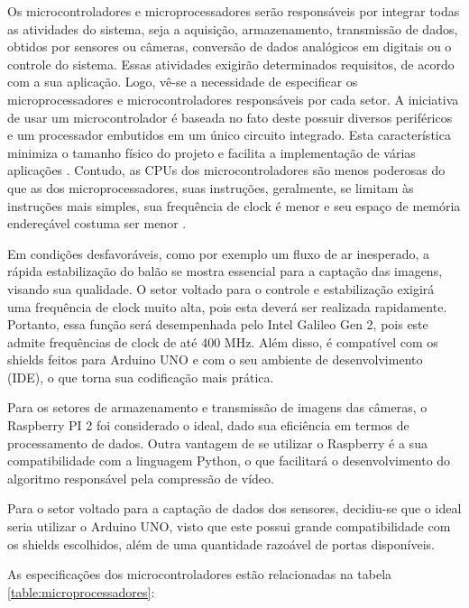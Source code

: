 Os microcontroladores e microprocessadores serão responsáveis por integrar todas as atividades do sistema, seja a aquisição, armazenamento, transmissão de dados, obtidos por sensores ou câmeras, conversão de dados analógicos em digitais ou o controle do sistema. Essas atividades exigirão determinados requisitos, de acordo com a sua aplicação. Logo, vê-se a necessidade de especificar os microprocessadores e microcontroladores responsáveis por cada setor. A iniciativa de usar um microcontrolador é baseada no fato deste possuir diversos periféricos e um processador embutidos em um único circuito integrado. Esta característica minimiza o tamanho físico do projeto e facilita a implementação de várias aplicações \cite{prado2009implementaccao}.  Contudo, as CPUs dos microcontroladores são menos poderosas do que as dos microprocessadores, suas instruções, geralmente, se limitam às instruções mais simples, sua frequência de clock é menor e seu espaço de memória endereçável costuma ser menor \cite{rucinski}.

Em condições desfavoráveis, como por exemplo um fluxo de ar inesperado, a rápida estabilização do balão se mostra essencial para a captação das imagens, visando sua qualidade. O setor voltado para o controle e estabilização exigirá uma frequência de clock muito alta, pois esta deverá ser realizada rapidamente. Portanto, essa função será desempenhada pelo Intel Galileo Gen 2, pois este admite frequências de clock de até 400 MHz. Além disso, é compatível com os shields feitos para Arduino UNO e com o seu ambiente de desenvolvimento (IDE), o que torna sua codificação mais prática.

Para os setores de armazenamento e transmissão de imagens das câmeras, o Raspberry PI 2 foi considerado o ideal, dado sua eficiência em termos de processamento de dados. Outra vantagem de se utilizar o Raspberry é a sua compatibilidade com a linguagem Python, o que facilitará o desenvolvimento do algoritmo responsável pela compressão de vídeo.

Para o setor voltado para a captação de dados dos sensores, decidiu-se que o ideal seria utilizar o Arduino UNO, visto que este possui grande compatibilidade com os shields escolhidos, além de uma quantidade razoável de portas disponíveis.

As especificações dos microcontroladores estão relacionadas na tabela \ref{table:microprocessadores}:

